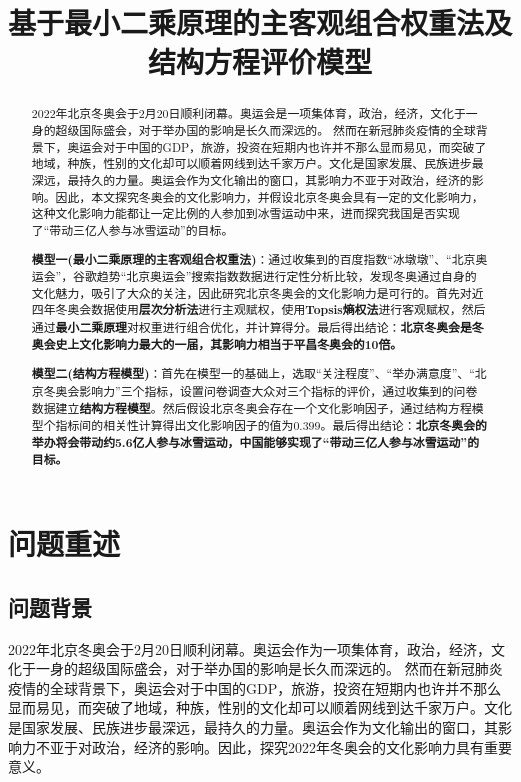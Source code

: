 \documentclass[withoutpreface,bwprint]{cumcmthesis} %
\title{基于最小二乘原理的主客观组合权重法及结构方程评价模型}
\begin{document}
 \maketitle
 
 
 \begin{abstract}
2022年北京冬奥会于2月20日顺利闭幕。奥运会是一项集体育，政治，经济，文化于一身的超级国际盛会，对于举办国的影响是长久而深远的。
然而在新冠肺炎疫情的全球背景下，奥运会对于中国的GDP，旅游，投资在短期内也许并不那么显而易见，而突破了地域，种族，性别的文化却可以顺着网线到达千家万户。文化是国家发展、民族进步最深远，最持久的力量。奥运会作为文化输出的窗口，其影响力不亚于对政治，经济的影响。因此，本文探究冬奥会的文化影响力，并假设北京冬奥会具有一定的文化影响力，这种文化影响力能都让一定比例的人参加到冰雪运动中来，进而探究我国是否实现了“带动三亿人参与冰雪运动”的目标。



\textbf{模型一(最小二乘原理的主客观组合权重法)}：通过收集到的百度指数“冰墩墩”、“北京奥运会”，谷歌趋势“北京奥运会”搜索指数数据进行定性分析比较，发现冬奥通过自身的文化魅力，吸引了大众的关注，因此研究北京冬奥会的文化影响力是可行的。首先对近四年冬奥会数据使用\textbf{层次分析法}进行主观赋权，使用\textbf{Topsis熵权法}进行客观赋权，然后通过\textbf{最小二乘原理}对权重进行组合优化，并计算得分。最后得出结论：\textbf{北京冬奥会是冬奥会史上文化影响力最大的一届，其影响力相当于平昌冬奥会的10倍。}

\textbf{模型二(结构方程模型)}：首先在模型一的基础上，选取“关注程度”、“举办满意度”、“北京冬奥会影响力”三个指标，设置问卷调查大众对三个指标的评价，通过收集到的问卷数据建立\textbf{结构方程模型}。然后假设北京冬奥会存在一个文化影响因子，通过结构方程模型个指标间的相关性计算得出文化影响因子的值为$0.399$。最后得出结论：\textbf{北京冬奥会的举办将会带动约5.6亿人参与冰雪运动，中国能够实现了“带动三亿人参与冰雪运动”的目标。}
 







\end{abstract}



\section{问题重述}
\subsection{问题背景}
2022年北京冬奥会于2月20日顺利闭幕。奥运会作为一项集体育，政治，经济，文化于一身的超级国际盛会，对于举办国的影响是长久而深远的。
然而在新冠肺炎疫情的全球背景下，奥运会对于中国的GDP，旅游，投资在短期内也许并不那么显而易见，而突破了地域，种族，性别的文化却可以顺着网线到达千家万户。文化是国家发展、民族进步最深远，最持久的力量。奥运会作为文化输出的窗口，其影响力不亚于对政治，经济的影响。因此，探究2022年冬奥会的文化影响力具有重要意义。
\end{document}
